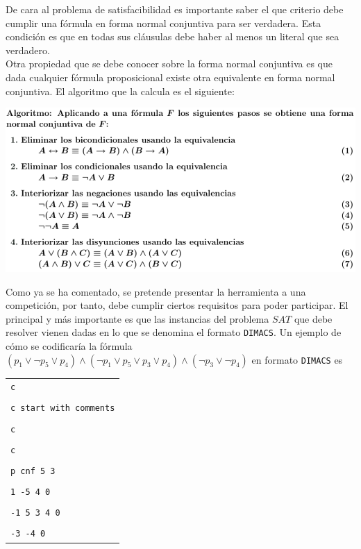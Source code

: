 De cara al problema de satisfacibilidad es importante saber el que criterio debe cumplir una fórmula en forma normal conjuntiva para ser verdadera. Esta condición es que en todas sus cláusulas debe haber al menos un literal que sea verdadero.\\

Otra propiedad que se debe conocer sobre la forma normal conjuntiva es que dada cualquier fórmula proposicional existe otra equivalente en forma normal conjuntiva. El algoritmo \cite{apuntes} que la calcula es el siguiente:

\begin{center}
\includegraphics[scale=0.45]{imagenes/algfnc}
\end{center}

Como ya se ha comentado, se pretende presentar la herramienta a una competición, por tanto, debe cumplir ciertos requisitos para poder participar. El principal y más importante es que las instancias del problema $SAT$ que debe resolver vienen dadas en lo que se denomina el formato \texttt{DIMACS}. Un ejemplo de cómo se codificaría la fórmula $(p_1 \vee \neg p_5 \vee p_4)\wedge(\neg p_1 \vee p_5 \vee p_3 \vee p_4) \wedge (\neg p_3 \vee \neg p_4)$ en formato \texttt{DIMACS} es
\begin{table}[h]
\centering
\label{ej:dimacs}
\begin{tabular}{l}
{\Large \texttt{c} }\\\\
{\Large \texttt{c start with comments}} \\\\
{\Large \texttt{c}} \\\\
{\Large \texttt{c}}  \\\\
{\Large \texttt{p cnf 5 3}} \\\\
{\Large \texttt{1 -5 4 0}} \\\\
{\Large \texttt{-1 5 3 4 0}} \\\\
{\Large \texttt{-3 -4 0}}
\end{tabular}
\end{table}

